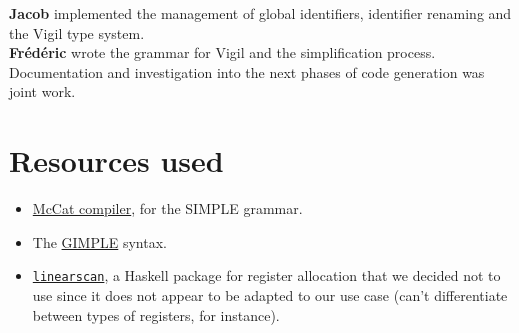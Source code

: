 \documentclass[letterpaper,11pt]{article}
\begin{document}
\textbf{Jacob} implemented the management of global identifiers, identifier renaming and the Vigil type system.
\\
\textbf{Fr\'ed\'eric} wrote the grammar for Vigil and the simplification process.
\\
Documentation and investigation into the next phases of code generation was joint work.
\section{Resources used}
\begin{itemize}
\item \href{https://web.archive.org/web/20040812030043/www-acaps.cs.mcgill.ca/info/McCAT/McCAT.html}{McCat compiler}, for the SIMPLE grammar.
\item The \href{https://gcc.gnu.org/onlinedocs/gccint/GIMPLE.html#GIMPLE}{GIMPLE} syntax.
\item \href{https://hackage.haskell.org/package/linearscan}{\texttt{linearscan}}, a Haskell package for register allocation that we decided not to use since it does not appear to be adapted to our use case (can't differentiate between types of registers, for instance).

\end{itemize}
\end{document}
